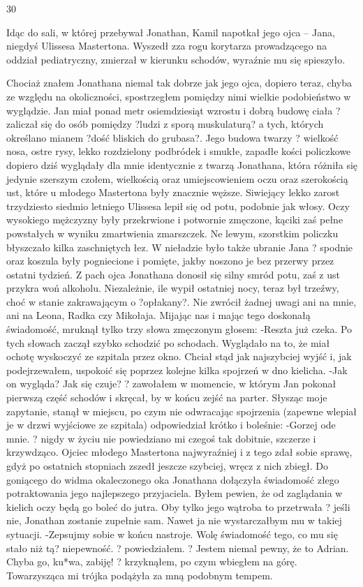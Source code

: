 \documentclass[../MAIN.tex]{subfiles}
\begin{document}
30


Idąc do sali, w której przebywał Jonathan, Kamil napotkał jego ojca -- Jana, niegdyś Ulissesa Mastertona. Wyszedł zza rogu korytarza prowadzącego na oddział pediatryczny, zmierzał w kierunku schodów, wyraźnie mu się spieszyło.


Chociaż znałem Jonathana niemal tak dobrze jak jego ojca, dopiero teraz, chyba ze względu na okoliczności, spostrzegłem pomiędzy nimi wielkie podobieństwo w wyglądzie.
Jan miał ponad metr osiemdziesiąt wzrostu i dobrą budowę ciała ? zaliczał się do osób pomiędzy ?ludzi z sporą muskulaturą? a tych, których określano mianem ?dość bliskich do grubasa?.
Jego budowa twarzy ? wielkość nosa, ostre rysy, lekko rozdzielony podbródek i smukłe, zapadłe kości policzkowe dopiero dziś wyglądały dla mnie identycznie z twarzą Jonathana, która różniła się jedynie szerszym czołem, wielkością oraz umiejscowieniem oczu oraz szerokością ust, które u młodego Mastertona były znacznie węższe.
Siwiejący lekko zarost trzydziesto siedmio letniego Ulissesa lepił się od potu, podobnie jak włosy. Oczy wysokiego mężczyzny były przekrwione i potwornie zmęczone, kąciki zaś pełne powstałych w wyniku zmartwienia zmarszczek. Ne lewym, szorstkim policzku błyszczało kilka zaschniętych łez.
W nieładzie było także ubranie Jana ? spodnie oraz koszula były pogniecione i pomięte, jakby noszono je bez przerwy przez ostatni tydzień. Z pach ojca Jonathana donosił się silny smród potu, zaś z ust przykra woń alkoholu. Niezależnie, ile wypił ostatniej nocy, teraz był trzeźwy, choć w stanie zakrawającym o ?opłakany?.
Nie zwrócił żadnej uwagi ani na mnie, ani na Leona, Radka czy Mikołaja. Mijając nas i mając tego doskonałą świadomość, mruknął tylko trzy słowa zmęczonym głosem:
-Reszta już czeka.
Po tych słowach zaczął szybko schodzić po schodach. Wyglądało na to, że miał ochotę wyskoczyć ze szpitala przez okno.
Chciał stąd jak najszybciej wyjść i, jak podejrzewałem, uspokoić się poprzez kolejne kilka spojrzeń w dno kielicha.
-Jak on wygląda? Jak się czuje? ? zawołałem w momencie, w którym Jan pokonał pierwszą część schodów i skręcał, by w końcu zejść na parter. Słysząc moje zapytanie, stanął w miejscu, po czym nie odwracając spojrzenia (zapewne wlepiał je w drzwi wyjściowe ze szpitala) odpowiedział krótko i boleśnie:
-Gorzej ode mnie. ? nigdy w życiu nie powiedziano mi czegoś tak dobitnie, szczerze i krzywdząco. Ojciec młodego Mastertona najwyraźniej i z tego zdał sobie sprawę, gdyż po ostatnich stopniach zszedł jeszcze szybciej, wręcz z nich zbiegł.
Do goniącego do widma okaleczonego oka Jonathana dołączyła świadomość złego potraktowania jego najlepszego przyjaciela.
Byłem pewien, że od zaglądania w kielich oczy będą go boleć do jutra.
Oby tylko jego wątroba to przetrwała ? jeśli nie, Jonathan zostanie zupełnie sam.
Nawet ja nie wystarczałbym mu w takiej sytuacji.
-Zepsujmy sobie w końcu nastroje. Wolę świadomość tego, co mu się stało niż tą? niepewność. ? powiedziałem. ? Jestem niemal pewny, że to Adrian. Chyba go, ku*wa, zabiję! ? krzyknąłem, po czym wbiegłem na górę. Towarzysząca mi trójka podążyła za mną podobnym tempem.
\end{document}
